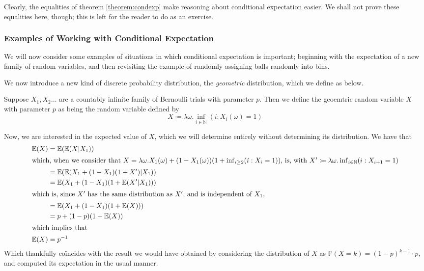 	Clearly, the equalities of theorem \ref{theorem:condexp} make reasoning about conditional 
	expectation easier. We shall not prove these equalities here, though; this is left for the
	reader to do as an exercise.

	\subsubsection{Examples of Working with Conditional Expectation}
	We will now consider some examples of situations in which conditional expectation is 
	important; beginning with the expectation of a new family of random variables, and then 
	revisiting the example of randomly assigning balls randomly into bins. \par
	We now introduce a new kind of discrete probability distribution, the \emph{geometric} 
	distribution, which we define as below.
	\begin{definition}
		Suppose $X_1, X_2 \hdots$ are a countably infinite family of Bernoulli trials with 
		parameter $p$. Then we define the geoemtric random variable $X$ with parameter $p$ 
		as being the random variable defined by 
		$$
			X\coloneqq \lambda \omega . \inf_{i \in \mathbb{N}}(i : X_i(\omega) = 1)
		$$
	\end{definition}

	Now, we are interested in the expected value of $X$, which we will determine entirely 
	without determining its distribution. We have that 
	\begin{align*}
		\mathbb{E}(X) &= \mathbb{E}(\mathbb{E}(X| X_1)) \\
		\intertext{which, when we consider that $X = \lambda \omega . X_1(\omega) + 
		(1-X_1(\omega))(1+ \inf_{i \geq 2}(i : X_i = 1))$, is, with $X' \coloneqq \lambda 
		\omega . \inf_{i \in \mathbb{N}}(i : X_{i+1} = 1)$}
		&=\mathbb{E}( \mathbb{E}(X_1 + (1-X_1)(1+X')| X_1))\\
		&= \mathbb{E}(X_1 +(1-X_1)(1+\mathbb{E}(X'|X_1))) \\
		\intertext{which is, since $X'$ has the same distribution as $X'$, 
		and is independent of $X_1$,}
		&= \mathbb{E}( X_1 +(1-X_1)(1+\mathbb{E}(X))) \\
		&= p + (1-p) (1+\mathbb{E}(X))\\
		\intertext{which implies that}
		\mathbb{E}(X) &= p^{-1}
	\end{align*}
	Which thankfully co\"incides with the result we would have obtained by considering the 
	distribution of $X$ as $\mathbb{P}(X=k) = (1-p)^{k-1}\cdot p$, and computed its 
	expectation in the usual manner.
	
